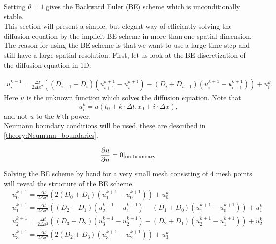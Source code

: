 Setting $\theta = 1$ gives the  Backward Euler (BE) scheme which is unconditionally stable. \\
This section will present a simple, but elegant way of efficiently solving the diffusion equation by the implicit BE scheme in more than one spatial dimension. The reason for using the BE scheme is that we want to use a large time step and still have a large spatial resolution. 
First, let us look at the BE discretization of the diffusion equation in 1D: 

\begin{align}\label{theory:BE_scheme_1D}
 u^{k+1}_i = \frac{\Delta t}{2\Delta x^2}\left((D_{i+1}+D_{i})(u^{k+1}_{i+1}-u^{k+1}_{i})-(D_{i}+D_{i-1})(u^{k+1}_{i}-u^{k+1}_{i-1})\right) + u^k_i.
\end{align}
Here $u$ is the unknown function which solves the diffusion equation. 
Note that 
$$u^k_i = u(t_0+k\cdot\Delta t,x_0+i\cdot\Delta x),$$
and not $u$ to the $k$'th power. \\
Neumann boundary conditions will be used, these are described in \eqref{theory:Neumann_boundaries}.

\begin{equation}\label{theory:Neumann_boundaries}
 \frac{\partial u}{\partial n} = 0|_{\text{on boundary}}
\end{equation}

\noindent Solving the BE scheme by hand for a very small mesh consisting of $4$ mesh points will reveal the structure of the BE scheme.
\begin{align*}
 &u^{k+1}_0 =  \frac{\Delta t}{2\Delta x^2}\left(2(D_{0}+D_{1})(u^{k+1}_{1}-u^{k+1}_{0})\right) + u^k_0\\
 &u^{k+1}_1 = \frac{\Delta t}{2\Delta x^2}\left((D_{2}+D_{1})(u^{k+1}_{2}-u^{k+1}_{1})-(D_{1}+D_{0})(u^{k+1}_{1}-u^{k+1}_{0})\right) + u^k_1\\
 &u^{k+1}_2 = \frac{\Delta t}{2\Delta x^2}\left((D_{3}+D_{2})(u^{k+1}_{3}-u^{k+1}_{2})-(D_{2}+D_{1})(u^{k+1}_{2}-u^{k+1}_{1})\right) + u^k_2 \\
 &u^{k+1}_3 =  \frac{\Delta t}{2\Delta x^2}\left(2(D_{2}+D_{3})(u^{k+1}_{3}-u^{k+1}_{2})\right) + u^k_3
\end{align*}

